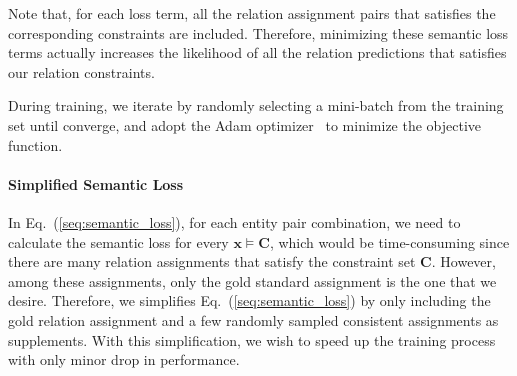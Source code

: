 Note that, for each loss term, all the relation assignment pairs that satisfies the corresponding constraints are included.
Therefore, minimizing these semantic loss terms actually increases the likelihood of all the relation predictions that satisfies our relation constraints.

During training, we iterate by randomly selecting a mini-batch from the training set until converge, and adopt the Adam optimizer~\cite{kingma2014adam} to minimize the objective function.
\paragraph{Simplified Semantic Loss}
In Eq.~(\ref{seq:semantic_loss}), for each entity pair combination, we need to calculate the semantic loss for every $\bm x \models \bm{C}$, which would be time-consuming since there are many relation assignments that satisfy the constraint set $\bm{C}$.
However, among these assignments, only the gold standard assignment is the one that we desire.
Therefore, we simplifies Eq.~(\ref{seq:semantic_loss}) by only including the gold relation assignment and a few randomly sampled consistent assignments as supplements.
With this simplification, we wish to speed up the training process with only minor drop in performance.





